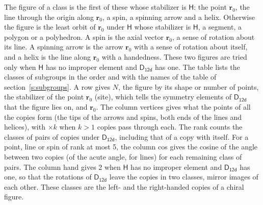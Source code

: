 \documentclass[10pt,a4paper]{article}
\numberwithin{equation}{section}
\newcommand{\grp}[1]{\mathsf{#1}}
\newcommand{\pointr}{\mathbf{r}}
\begin{document}
\leavevmode\label{n:head.figure}The figure of a class is the first of these whose stabilizer is $\grp{H}$: the point $\pointr_0$, the line through the origin along $\pointr_0$, a spin, a spinning arrow and a helix. Otherwise the figure is the least orbit of $\pointr_0$ under $\grp{H}$ whose stabilizer is $\grp{H}$, a segment, a polygon or a polyhedron. A spin is the axial vector $\pointr_0$, a sense of rotation about its line. A spinning arrow is the arrow $\pointr_0$ with a sense of rotation about itself, and a helix is the line along $\pointr_0$ with a handedness. These two figures are tried only when $\grp{H}$ has no improper element and $\grp{D_{12d}}$ has one. The table lists the classes of subgroups in the order and with the names of the table of section~\ref{s:subgroups}. \label{n:head.site}A row gives $N$, the figure by its shape or number of points, the stabilizer of the point $\pointr_0$ (site), which tells the symmetry elements of $\grp{D_{12d}}$ that the figure lies on, and $\pointr_0$. \label{n:head.vertices}The column vertices gives what the points of all the copies form (the tips of the arrows and spins, both ends of the lines and helices), with ${\times}k$ when $k > 1$ copies pass through each. \label{n:head.rank}The rank counts the classes of pairs of copies under $\grp{D_{12d}}$, including that of a copy with itself. \label{n:head.cos}For a point, line or spin of rank at most 5, the column cos gives the cosine of the angle between two copies (of the acute angle, for lines) for each remaining class of pairs. \label{n:head.hand}The column hand gives 2 when $\grp{H}$ has no improper element and $\grp{D_{12d}}$ has one, so that the rotations of $\grp{D_{12d}}$ leave the copies in two classes, mirror images of each other. These classes are the left- and the right-handed copies of a chiral figure.
\end{document}
